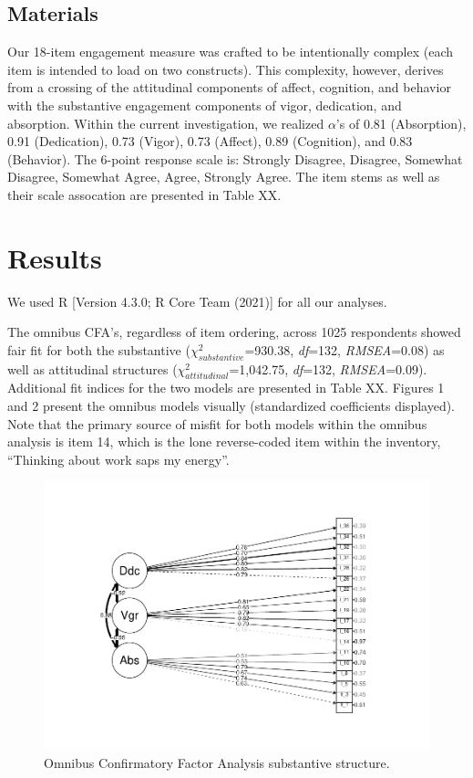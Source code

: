 \documentclass[
  man]{apa6}
\begin{document}
\hypertarget{materials}{%
\subsection{Materials}\label{materials}}

Our 18-item engagement measure was crafted to be intentionally complex (each item is intended to load on two constructs). This complexity, however, derives from a crossing of the attitudinal components of affect, cognition, and behavior with the substantive engagement components of vigor, dedication, and absorption. Within the current investigation, we realized \(\alpha\)'s of 0.81 (Absorption), 0.91 (Dedication), 0.73 (Vigor), 0.73 (Affect), 0.89 (Cognition), and 0.83 (Behavior). The 6-point response scale is: Strongly Disagree, Disagree, Somewhat Disagree, Somewhat Agree, Agree, Strongly Agree. The item stems as well as their scale assocation are presented in Table XX.

\hypertarget{results}{%
\section{Results}\label{results}}

We used R {[}Version 4.3.0; R Core Team (2021){]} for all our analyses.

The omnibus CFA's, regardless of item ordering, across 1025 respondents showed fair fit for both the substantive (\(\chi^2_{substantive}\)=930.38, \emph{df}=132, \emph{RMSEA}=0.08) as well as attitudinal structures (\(\chi^2_{attitudinal}\)=1,042.75, \emph{df}=132, \emph{RMSEA}=0.09). Additional fit indices for the two models are presented in Table XX. Figures 1 and 2 present the omnibus models visually (standardized coefficients displayed). Note that the primary source of misfit for both models within the omnibus analysis is item 14, which is the lone reverse-coded item within the inventory, ``Thinking about work saps my energy''.

\begin{figure}
\centering
\includegraphics{EngagementPaper2_files/figure-latex/semplotsub-1.pdf}
\caption{\label{fig:semplotsub}Omnibus Confirmatory Factor Analysis substantive structure.}
\end{figure}
\end{document}
